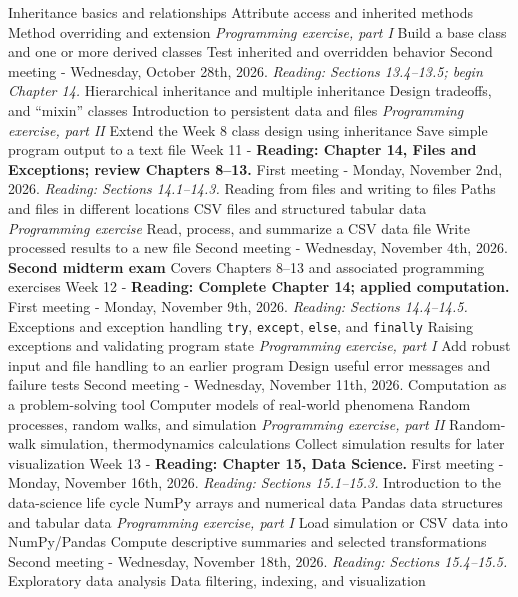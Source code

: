 \documentclass[10pt]{article}
\begin{document}
\begin{outline}[enumerate]
\3 Inheritance basics and relationships
\3 Attribute access and inherited methods
\3 Method overriding and extension
\3 \textit{Programming exercise, part I}
\4 Build a base class and one or more derived classes
\4 Test inherited and overridden behavior
\2 Second meeting - Wednesday, October 28th, 2026. \textit{Reading: Sections 13.4--13.5; begin Chapter 14.}
\3 Hierarchical inheritance and multiple inheritance
\3 Design tradeoffs, and ``mixin'' classes
\3 Introduction to persistent data and files
\3 \textit{Programming exercise, part II}
\4 Extend the Week 8 class design using inheritance
\4 Save simple program output to a text file
\1 Week 11 - \textbf{Reading: Chapter 14, Files and Exceptions; review Chapters 8--13.}
\2 First meeting - Monday, November 2nd, 2026. \textit{Reading: Sections 14.1--14.3.}
\3 Reading from files and writing to files
\3 Paths and files in different locations
\3 CSV files and structured tabular data
\3 \textit{Programming exercise}
\4 Read, process, and summarize a CSV data file
\4 Write processed results to a new file
\2 Second meeting - Wednesday, November 4th, 2026.
\3 \textbf{Second midterm exam}
\4 Covers Chapters 8--13 and associated programming exercises
\1 Week 12 - \textbf{Reading: Complete Chapter 14; applied computation.}
\2 First meeting - Monday, November 9th, 2026. \textit{Reading: Sections 14.4--14.5.}
\3 Exceptions and exception handling
\3 \texttt{try}, \texttt{except}, \texttt{else}, and \texttt{finally}
\3 Raising exceptions and validating program state
\3 \textit{Programming exercise, part I}
\4 Add robust input and file handling to an earlier program
\4 Design useful error messages and failure tests
\2 Second meeting - Wednesday, November 11th, 2026.
\3 Computation as a problem-solving tool
\3 Computer models of real-world phenomena
\3 Random processes, random walks, and simulation
\3 \textit{Programming exercise, part II}
\4 Random-walk simulation, thermodynamics calculations
\4 Collect simulation results for later visualization
\1 Week 13 - \textbf{Reading: Chapter 15, Data Science.}
\2 First meeting - Monday, November 16th, 2026. \textit{Reading: Sections 15.1--15.3.}
\3 Introduction to the data-science life cycle
\3 NumPy arrays and numerical data
\3 Pandas data structures and tabular data
\3 \textit{Programming exercise, part I}
\4 Load simulation or CSV data into NumPy/Pandas
\4 Compute descriptive summaries and selected transformations
\2 Second meeting - Wednesday, November 18th, 2026. \textit{Reading: Sections 15.4--15.5.}
\3 Exploratory data analysis
\3 Data filtering, indexing, and visualization

\end{outline}
\end{document}
